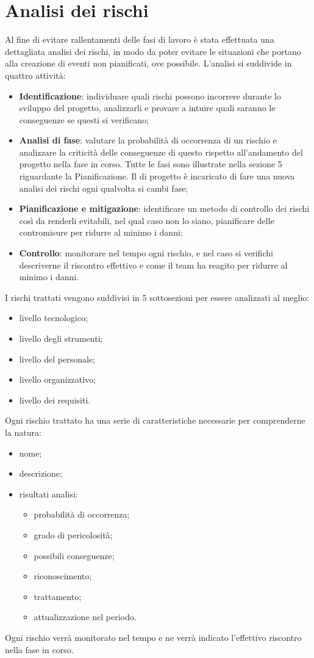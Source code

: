 \documentclass[PianoDiProgetto.tex]{subfiles}
\begin{document}
\section{Analisi dei rischi}
Al fine di evitare rallentamenti delle fasi di lavoro è stata effettuata una dettagliata analisi dei rischi, in modo da poter evitare le situazioni che portano alla creazione di eventi non pianificati, ove possibile. L'analisi si suddivide in quattro attività:
	\begin{itemize}
		\item \textbf{Identificazione}: individuare quali rischi possono incorrere durante lo sviluppo del progetto, analizzarli e provare a intuire quali saranno le conseguenze se questi si verificano;
		\item \textbf{Analisi di fase}: valutare la probabilità di occorrenza di un rischio e analizzare la criticità delle conseguenze di questo rispetto all'andamento del progetto nella fase in corso. Tutte le fasi sono illustrate nella sezione 5 riguardante la Pianificazione. Il \RESP{} di progetto è incaricato  di fare una nuova analisi dei rischi ogni qualvolta si cambi fase;
		\item \textbf{Pianificazione e mitigazione}: identificare un metodo di controllo dei rischi così da renderli evitabili, nel qual caso non lo siano, pianificare delle contromisure per ridurre al minimo i danni; 
		\item \textbf{Controllo}: monitorare nel tempo ogni rischio, e nel caso si verifichi descriverne il riscontro effettivo e come il team ha reagito per ridurre al minimo i danni. 
	\end{itemize}
I rischi trattati vengono suddivisi in 5 sottosezioni per essere analizzati al meglio:
	\begin{itemize}
		\item livello tecnologico;
		\item livello degli strumenti;
		\item livello del personale;
		\item livello organizzativo;
		\item livello dei requisiti.
	\end{itemize}
Ogni rischio trattato ha una serie di caratteristiche necessarie per comprenderne la natura:
	\begin{itemize}
		\item nome;
		\item descrizione;
		\item risultati analisi:
			\begin{itemize}
				\item probabilità di occorrenza;
				\item grado di pericolosità;
				\item possibili conseguenze;
				\item riconoscimento;
				\item trattamento;
				\item attualizzazione nel periodo.
			\end{itemize}
	\end{itemize}
Ogni rischio verrà monitorato nel tempo e ne verrà indicato l'effettivo riscontro nella fase in corso.
\end{document}
